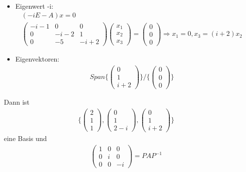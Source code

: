 \begin{itemize}
\begin{align}
\end{align}
\item Eigenwert -i:
\begin{align}
(-iE-A)x = 0 \\
\begin{pmatrix} -i-1 & 0 & 0 \\ 0 & -i-2 & 1 \\ 0 & -5 & -i+2 \end{pmatrix} \begin{pmatrix} x_1 \\ x_2 \\ x_3\end{pmatrix} = \begin{pmatrix} 0 \\ 0 \\ 0 \end{pmatrix} \Rightarrow x_1 = 0, x_3 = (i+2)x_2  
\end{align}
\item Eigenvektoren:
\begin{align}
Span\{\begin{pmatrix} 0 \\ 1 \\ i+2 \end{pmatrix}\} / \{ \begin{pmatrix} 0 \\ 0 \\ 0 \end{pmatrix} \}
\end{align}
\end{itemize}
Dann ist 
\begin{align}
\{\begin{pmatrix} 2 \\ 1 \\ 1 \end{pmatrix}, \begin{pmatrix} 0 \\ 1 \\ 2-i \end{pmatrix}, \begin{pmatrix} 0 \\ 1 \\ i+2 \end{pmatrix} \}
\end{align}
eine Basis und
\begin{align}
\begin{pmatrix} 1 & 0 & 0 \\ 0 & i & 0 \\ 0 & 0 & -i\end{pmatrix} = PAP^{-1}
\end{align}
